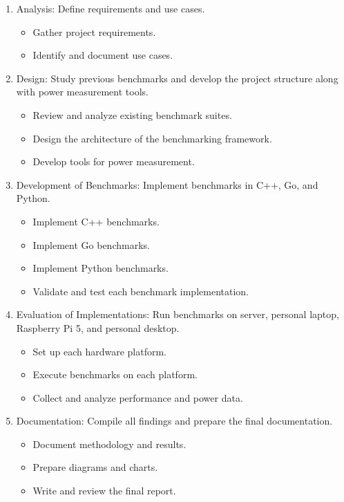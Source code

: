 \begin{enumerate}
  \item Analysis: Define requirements and use cases.
  \begin{itemize}
    \item Gather project requirements.
    \item Identify and document use cases.
  \end{itemize}
  \item Design: Study previous benchmarks and develop the project structure along with power measurement tools.
  \begin{itemize}
    \item Review and analyze existing benchmark suites.
    \item Design the architecture of the benchmarking framework.
    \item Develop tools for power measurement.
  \end{itemize}
  \item Development of Benchmarks: Implement benchmarks in C++, Go, and Python.
  \begin{itemize}
    \item Implement C++ benchmarks.
    \item Implement Go benchmarks.
    \item Implement Python benchmarks.
    \item Validate and test each benchmark implementation.
  \end{itemize}
  \item Evaluation of Implementations: Run benchmarks on server, personal laptop, Raspberry Pi 5, and personal desktop.
  \begin{itemize}
    \item Set up each hardware platform.
    \item Execute benchmarks on each platform.
    \item Collect and analyze performance and power data.
  \end{itemize}
  \item Documentation: Compile all findings and prepare the final documentation.
  \begin{itemize}
    \item Document methodology and results.
    \item Prepare diagrams and charts.
    \item Write and review the final report.
  \end{itemize}
\end{enumerate}
